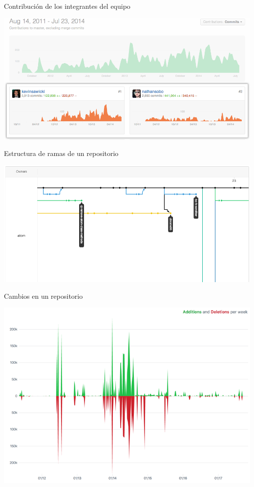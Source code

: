 \documentclass[xcolor={usenames,svgnames,dvipsnames}]{beamer}
\begin{document}
\begin{frame}[label={sec:org88aa87f}]{Contribución de los integrantes del equipo}
\begin{center}
\includegraphics[width=.9\linewidth]{figs/repo_contributors_specific_graph.png}
\end{center}
\end{frame}

\begin{frame}[label={sec:orgc8e309e}]{Estructura de ramas de un repositorio}
\begin{center}
\includegraphics[width=.9\linewidth]{figs/repo_network_graph.png}
\end{center}
\end{frame}

\begin{frame}[label={sec:orga25e9d6}]{Cambios en un repositorio}
\begin{center}
\includegraphics[width=.9\linewidth]{figs/repo_code_frequency_graph_dotcom.png}
\end{center}
\end{frame}
\end{document}
